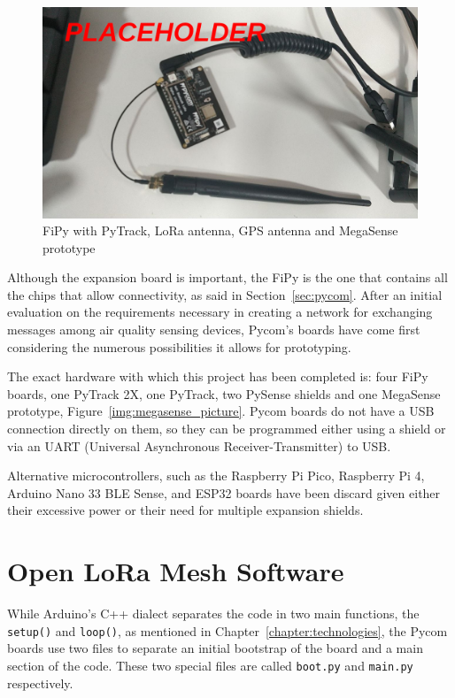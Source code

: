 		\begin{figure}[h]
			\centering
			\includegraphics[width=\textwidth]{resources/img/chap5/mesh-irl-picture}
			\caption{FiPy with PyTrack, LoRa antenna, GPS antenna and MegaSense prototype}
			\label{img:irl_picture_1}
		\end{figure}
		
		Although the expansion board is important, the FiPy is the one that contains all the chips that allow connectivity, as said in Section~\ref{sec:pycom}.
		After an initial evaluation on the requirements necessary in creating a network for exchanging messages among air quality sensing devices, Pycom's boards have come first considering the numerous possibilities it allows for prototyping.
		
		The exact hardware with which this project has been completed is: four FiPy boards, one PyTrack 2X, one PyTrack, two PySense shields and one MegaSense prototype, Figure~\ref{img:megasense_picture}.
		Pycom boards do not have a USB connection directly on them, so they can be programmed either using a shield or via an UART (Universal Asynchronous Receiver-Transmitter) to USB.
		
		Alternative microcontrollers, such as the Raspberry Pi Pico, Raspberry Pi 4, Arduino Nano 33 BLE Sense, and ESP32 boards have been discard given either their excessive power or their need for multiple expansion shields.
				
	\section{Open LoRa Mesh Software}\label{sec:software_solution}
	
		While Arduino's C++ dialect separates the code in two main functions, the \texttt{setup()} and \texttt{loop()}, as mentioned in Chapter~\ref{chapter:technologies}, the Pycom boards use two files to separate an initial bootstrap of the board and a main section of the code.
		These two special files are called \texttt{boot.py} and \texttt{main.py} respectively.
		

